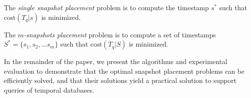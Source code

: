 \begin{definition}
    The {\em single snapshot placement} problem is
    to compute the timestamp $s^*$ such that $\mathrm{cost}(T_q | s)$ is
    minimized.

    The {\em $m$-snapshots placement} problem is
    to compute a set of timestamps $S^* = \{s_1, s_2, \dots s_m\}$
    such that $\mathrm{cost}(T_q | S)$ is minimized.
\end{definition}

In the remainder of the paper, we present the algorithms and experimental
evaluation to demonstrate that the optimal snapshot placement problems can be
efficiently solved, and that their solutions yield a practical solution to
support queries of temporal databases.
